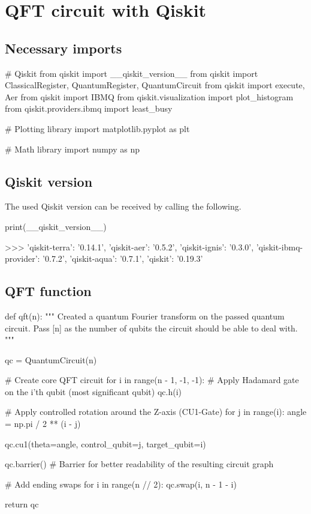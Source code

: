 \section{QFT circuit with Qiskit}
\label{sec:qft-circuit-qiskit}

\subsection{Necessary imports}
\label{subsec:qft-circuit-qiskit-necessary-imports}

\begin{python}
# Qiskit
from qiskit import __qiskit_version__
from qiskit import ClassicalRegister, QuantumRegister, QuantumCircuit
from qiskit import execute, Aer
from qiskit import IBMQ
from qiskit.visualization import plot_histogram
from qiskit.providers.ibmq import least_busy

# Plotting library
import matplotlib.pyplot as plt

# Math library
import numpy as np
\end{python}

\subsection{Qiskit version}
\label{subsec:qiskit-version}

The used Qiskit version can be received by calling the following.

\begin{python}
print(__qiskit_version__)

>>> {'qiskit-terra': '0.14.1',
'qiskit-aer': '0.5.2',
'qiskit-ignis': '0.3.0',
'qiskit-ibmq-provider': '0.7.2',
'qiskit-aqua': '0.7.1',
'qiskit': '0.19.3'}
\end{python}

\subsection{QFT function}
\label{subsec:qft-function}

\begin{python}
def qft(n):
    """
    Created a quantum Fourier transform on the passed quantum circuit.
    Pass [n] as the number of qubits the circuit should be able to deal with.
    """

    qc = QuantumCircuit(n)

    # Create core QFT circuit
    for i in range(n - 1, -1, -1):
        # Apply Hadamard gate on the i'th qubit (most significant qubit)
        qc.h(i)

    # Apply controlled rotation around the Z-axis (CU1-Gate)
    for j in range(i):
        angle = np.pi / 2 ** (i - j)

        qc.cu1(theta=angle, control_qubit=j, target_qubit=i)

        qc.barrier() # Barrier for better readability of the resulting circuit graph

    # Add ending swaps
    for i in range(n // 2):
        qc.swap(i, n - 1 - i)

    return qc
\end{python}

